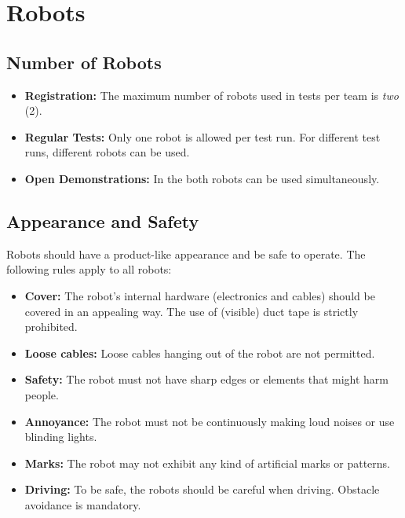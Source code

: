 \section{Robots}
\label{sec:rules:robots}

\subsection{Number of Robots}
\label{sec:rules:robotsnumber}

\begin{itemize}
	\item \textbf{Registration:} The maximum number of robots used in tests per team is \emph{two} (2).
	\item \textbf{Regular Tests:} Only one robot is allowed per test run. For different test runs, different robots can be used.
	\item \textbf{Open Demonstrations:} In the  both robots can be used simultaneously.
\end{itemize}

\subsection{Appearance and Safety}
\label{sec:rules:robotappearance}

Robots should have a product-like appearance and be safe to operate. The following rules apply to all robots:
\begin{itemize}
	\item \textbf{Cover:} The robot's internal hardware (electronics and cables) should be covered in an appealing way. The use of (visible) duct tape is strictly prohibited.
	\item \textbf{Loose cables:} Loose cables hanging out of the robot are not permitted.
	\item \textbf{Safety:} The robot must not have sharp edges or elements that might harm people.
	\item \textbf{Annoyance:} The robot must not be continuously making loud noises or use blinding lights.
	\item \textbf{Marks:} The robot may not exhibit any kind of artificial marks or patterns.
	\item \textbf{Driving:} To be safe, the robots should be careful when driving. Obstacle avoidance is mandatory.
\end{itemize}







